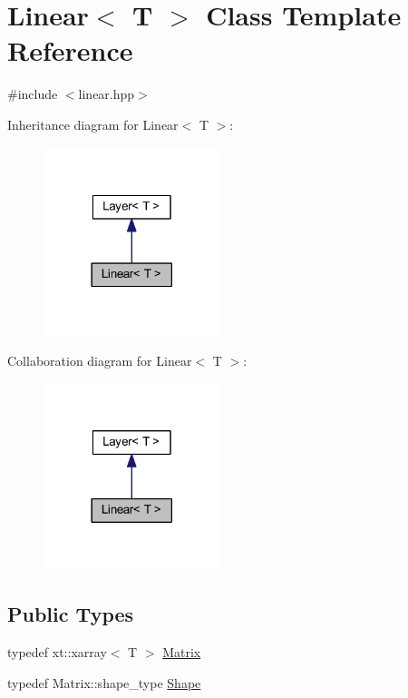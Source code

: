 \hypertarget{class_linear}{}\section{Linear$<$ T $>$ Class Template Reference}
\label{class_linear}


{\ttfamily \#include $<$linear.\+hpp$>$}



Inheritance diagram for Linear$<$ T $>$\+:
\nopagebreak
\begin{figure}[H]
\begin{center}
\leavevmode
\includegraphics[width=146pt]{class_linear__inherit__graph}
\end{center}
\end{figure}


Collaboration diagram for Linear$<$ T $>$\+:
\nopagebreak
\begin{figure}[H]
\begin{center}
\leavevmode
\includegraphics[width=146pt]{class_linear__coll__graph}
\end{center}
\end{figure}
\subsection*{Public Types}
\begin{DoxyCompactItemize}
\item 
typedef xt\+::xarray$<$ T $>$ \mbox{\hyperlink{class_linear_a8e402d70272bdb6406745f7ec4139f16}{Matrix}}
\item 
typedef Matrix\+::shape\+\_\+type \mbox{\hyperlink{class_linear_afeccdcd7a158d0fe034436e4eafae066}{Shape}}
\end{DoxyCompactItemize}
